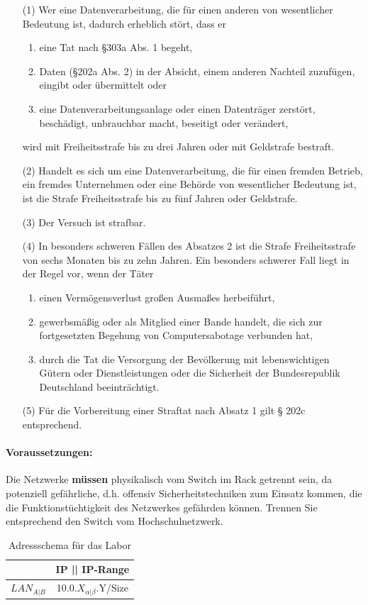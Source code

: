 \documentclass[paper=a4,fontsize=11pt]{scrartcl}%
\numberwithin{equation}{section}
\begin{document}
\begin{enumerate}
	\item[(1)] Wer eine Datenverarbeitung, die für einen anderen von wesentlicher Bedeutung ist, dadurch erheblich stört, dass er
	\begin{enumerate}
		\item eine Tat nach \S 303a Abs. 1 begeht,
		\item Daten (\S 202a Abs. 2) in der Absicht, einem anderen Nachteil zuzufügen, eingibt oder übermittelt oder
		\item eine Datenverarbeitungsanlage oder einen Datenträger zerstört, beschädigt, unbrauchbar macht, beseitigt oder verändert,
	\end{enumerate}
	wird mit Freiheitsstrafe bis zu drei Jahren oder mit Geldstrafe bestraft.
	\item[(2)] Handelt es sich um eine Datenverarbeitung, die für einen fremden Betrieb, ein fremdes Unternehmen oder eine Behörde von wesentlicher Bedeutung ist, ist die Strafe Freiheitsstrafe bis zu fünf Jahren oder Geldstrafe.
	\item[(3)] Der Versuch ist strafbar.
	\item[(4)] In besonders schweren Fällen des Absatzes 2 ist die Strafe Freiheitsstrafe von sechs Monaten bis zu zehn Jahren. Ein besonders schwerer Fall liegt in der Regel vor, wenn der Täter
	\begin{enumerate}
		\item einen Vermögensverlust großen Ausmaßes herbeiführt,
		\item gewerbsmäßig oder als Mitglied einer Bande handelt, die sich zur fortgesetzten Begehung von Computersabotage verbunden hat,
		\item durch die Tat die Versorgung der Bevölkerung mit lebenswichtigen Gütern oder Dienstleistungen oder die Sicherheit der Bundesrepublik Deutschland beeinträchtigt.
	\end{enumerate}
	\item[(5)] Für die Vorbereitung einer Straftat nach Absatz 1 gilt § 202c entsprechend.
\end{enumerate}

\paragraph{Voraussetzungen:}
Die Netzwerke \textbf{müssen} physikalisch vom Switch im Rack getrennt sein, da potenziell \glqq gefährliche\grqq, d.h. offensiv Sicherheitstechniken zum Einsatz kommen, die die Funktionstüchtigkeit des Netzwerkes gefährden können. Trennen Sie entsprechend den Switch vom Hochschulnetzwerk.
\begin{table}[H]
\caption{Adressschema für das Labor}
\label{adress_scheme}
\centering
\begin{tabular}{|c|c|}\hline
 & \textbf{IP  || IP-Range} \\ \hline
 $LAN_{A|B}$ & 10.0.$X_{\alpha|\beta}$.Y/Size \\ \hline
\end{tabular}
\end{table}
\end{document}
